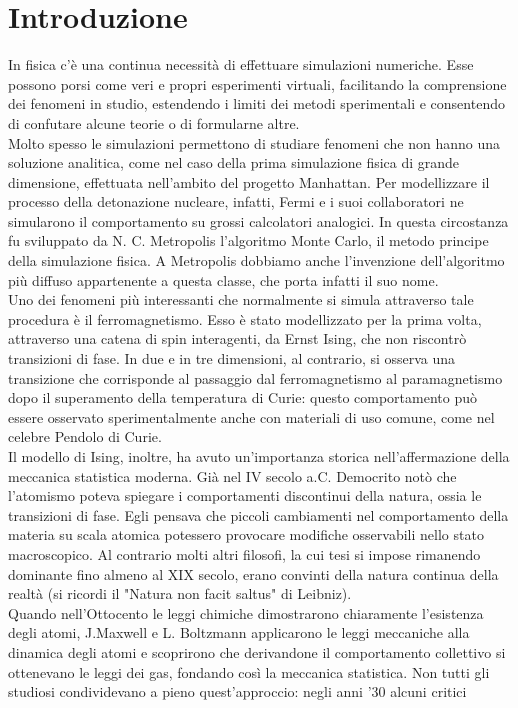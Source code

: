 \documentclass[Lau, noexaminfo, oneside]{sapthesis} %
\begin{document}
\chapter{Introduzione}
In fisica c'è una continua necessità di effettuare simulazioni numeriche. Esse possono porsi come veri e propri esperimenti virtuali, facilitando la comprensione dei fenomeni in studio, estendendo i limiti dei metodi sperimentali e consentendo di confutare alcune teorie o di formularne altre. \\
Molto spesso le simulazioni permettono di studiare fenomeni che non hanno una soluzione analitica, come nel caso della prima simulazione fisica di grande dimensione, effettuata nell'ambito del progetto Manhattan.
Per modellizzare il processo della detonazione nucleare, infatti, Fermi e i suoi collaboratori ne simularono il comportamento su grossi calcolatori analogici. In questa circostanza fu sviluppato da N. C. Metropolis l'algoritmo Monte Carlo, il metodo principe della simulazione fisica. A Metropolis dobbiamo anche l'invenzione dell'algoritmo più diffuso appartenente a questa classe, che porta infatti il suo nome.\\
Uno dei fenomeni più interessanti che normalmente si simula attraverso tale procedura è il ferromagnetismo. Esso è stato modellizzato per la prima volta, attraverso una catena di spin interagenti, da Ernst Ising, che non riscontrò transizioni di fase. In due e in tre dimensioni, al contrario, si osserva una transizione che corrisponde al passaggio dal ferromagnetismo al paramagnetismo dopo il superamento della temperatura di Curie: questo comportamento può essere osservato sperimentalmente anche con materiali di uso comune, come nel celebre Pendolo di Curie. \\
Il modello di Ising, inoltre, ha avuto un'importanza storica nell'affermazione della meccanica statistica moderna.
Già nel IV secolo a.C. Democrito notò che l'atomismo poteva spiegare i comportamenti discontinui della natura, ossia le transizioni di fase. Egli pensava che piccoli cambiamenti nel comportamento della materia su scala atomica potessero provocare modifiche osservabili nello stato macroscopico. 
Al contrario molti altri filosofi, la cui tesi si impose rimanendo dominante fino almeno al XIX secolo, erano convinti della natura continua della realtà (si ricordi il "Natura non facit saltus" di Leibniz). \\
Quando nell'Ottocento le leggi chimiche dimostrarono chiaramente l'esistenza degli atomi, J.Maxwell e L. Boltzmann applicarono le leggi meccaniche alla dinamica degli atomi e scoprirono che derivandone il comportamento collettivo si ottenevano le leggi dei gas, fondando così la meccanica statistica. Non tutti gli studiosi condividevano a pieno quest'approccio: negli anni '30 alcuni critici
\end{document}
